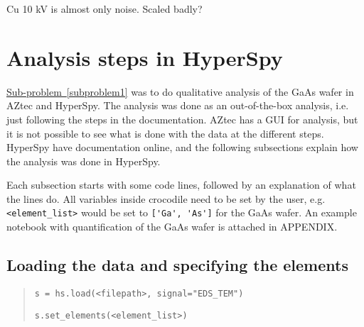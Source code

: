 Cu 10 kV is almost only noise. Scaled badly?




















%
%
\section{Analysis steps in HyperSpy}
\label{sec:discussion:steps}

\hyperref[subproblem1]{Sub-problem~\ref*{subproblem1}} was to do qualitative analysis of the GaAs wafer in AZtec and HyperSpy.
The analysis was done as an out-of-the-box analysis, i.e. just following the steps in the documentation.
AZtec has a GUI for analysis, but it is not possible to see what is done with the data at the different steps.
HyperSpy have documentation online, and the following subsections explain how the analysis was done in HyperSpy.

Each subsection starts with some code lines, followed by an explanation of what the lines do.
All variables inside crocodile need to be set by the user, e.g. \verb|<element_list>| would be set to \verb|['Ga', 'As']| for the GaAs wafer.
An example notebook with quantification of the GaAs wafer is attached in APPENDIX.

\subsection{Loading the data and specifying the elements}
\label{sec:discussion:steps:load}
\begin{quote}
    \verb|s = hs.load(<filepath>, signal="EDS_TEM")|

    \verb|s.set_elements(<element_list>)|
\end{quote}

